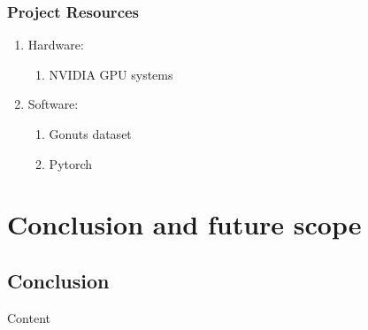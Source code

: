 \documentclass[oneside,a4paper,12pt, times]{book}
\begin{document}
\subsection{Project Resources}
\begin{enumerate}
	\item Hardware:
	\begin{enumerate}
		\item NVIDIA GPU systems
		
	\end{enumerate}
	\item Software:
	\begin{enumerate}
		\item Gonuts dataset
		\item Pytorch
	\end{enumerate}
\end{enumerate}

 \chapter{Conclusion and future scope}
\section{Conclusion}
Content

% 



\end{document}
